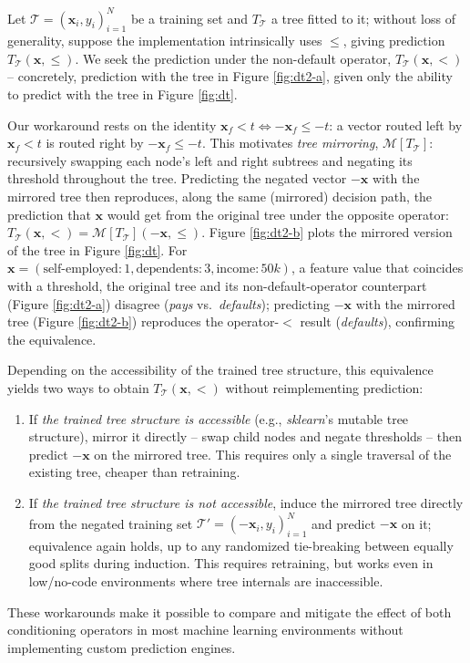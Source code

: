 \documentclass[5p,twocolumn,authoryear]{elsarticle}
\theoremstyle{plain}%
\theoremstyle{remark}%
\theoremstyle{definition}%
\begin{document}
Let $\mathcal{T} = (\mathbf{x}_i, y_i)_{i=1}^N$ be a training set and $T_{\mathcal{T}}$ a tree fitted to it; without loss of generality, suppose the implementation intrinsically uses $\leq$, giving prediction $T_{\mathcal{T}}(\mathbf{x}, \leq)$. We seek the prediction under the non-default operator, $T_{\mathcal{T}}(\mathbf{x}, <)$ -- concretely, prediction with the tree in Figure \ref{fig:dt2-a}, given only the ability to predict with the tree in Figure \ref{fig:dt}.

Our workaround rests on the identity $\mathbf{x}_f < t \Leftrightarrow -\mathbf{x}_f \leq -t$: a vector routed left by $\mathbf{x}_f < t$ is routed right by $-\mathbf{x}_f \leq -t$. This motivates \emph{tree mirroring}, $\mathcal{M}[T_{\mathcal{T}}]$: recursively swapping each node's left and right subtrees and negating its threshold throughout the tree. Predicting the negated vector $-\mathbf{x}$ with the mirrored tree then reproduces, along the same (mirrored) decision path, the prediction that $\mathbf{x}$ would get from the original tree under the opposite operator: $T_{\mathcal{T}}(\mathbf{x}, <) = \mathcal{M}[T_{\mathcal{T}}](-\mathbf{x}, \leq)$.
Figure \ref{fig:dt2-b} plots the mirrored version of the tree in Figure \ref{fig:dt}. For $\mathbf{x} = (\text{self-employed}: 1, \text{dependents}: 3, \text{income}: 50k)$, a feature value that coincides with a threshold, the original tree and its non-default-operator counterpart (Figure \ref{fig:dt2-a}) disagree (\emph{pays} vs.\ \emph{defaults}); predicting $-\mathbf{x}$ with the mirrored tree (Figure \ref{fig:dt2-b}) reproduces the operator-$<$ result (\emph{defaults}), confirming the equivalence.

Depending on the accessibility of the trained tree structure, this equivalence yields two ways to obtain $T_{\mathcal{T}}(\mathbf{x}, <)$ without reimplementing prediction:
\begin{enumerate}
\item If \emph{the trained tree structure is accessible} (e.g., \emph{sklearn}'s \citep{sklearn} mutable tree structure), mirror it directly -- swap child nodes and negate thresholds -- then predict $-\mathbf{x}$ on the mirrored tree. This requires only a single traversal of the existing tree, cheaper than retraining.
\item If \emph{the trained tree structure is not accessible}, induce the mirrored tree directly from the negated training set $\mathcal{T}' = (-\mathbf{x}_i, y_i)_{i=1}^N$ and predict $-\mathbf{x}$ on it; equivalence again holds, up to any randomized tie-breaking between equally good splits during induction. This requires retraining, but works even in low/no-code environments \citep{nocode} where tree internals are inaccessible.
\end{enumerate}
These workarounds make it possible to compare and mitigate the effect of both conditioning operators in most machine learning environments without implementing custom prediction engines.
\end{document}
